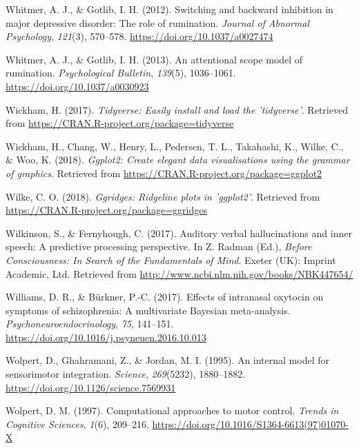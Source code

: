 \documentclass[a4paper,12pt,twoside,onecolumn,openright,final,oldfontcommands]{memoir}
\begin{document}
\leavevmode\hypertarget{ref-whitmer_switching_2012}{}%
Whitmer, A. J., \& Gotlib, I. H. (2012). Switching and backward inhibition in major depressive disorder: The role of rumination. \emph{Journal of Abnormal Psychology}, \emph{121}(3), 570--578. \url{https://doi.org/10.1037/a0027474}

\leavevmode\hypertarget{ref-Whitmer2013}{}%
Whitmer, A. J., \& Gotlib, I. H. (2013). An attentional scope model of rumination. \emph{Psychological Bulletin}, \emph{139}(5), 1036--1061. \url{https://doi.org/10.1037/a0030923}

\leavevmode\hypertarget{ref-R-tidyverse}{}%
Wickham, H. (2017). \emph{Tidyverse: Easily install and load the 'tidyverse'}. Retrieved from \url{https://CRAN.R-project.org/package=tidyverse}

\leavevmode\hypertarget{ref-R-ggplot2}{}%
Wickham, H., Chang, W., Henry, L., Pedersen, T. L., Takahashi, K., Wilke, C., \& Woo, K. (2018). \emph{Ggplot2: Create elegant data visualisations using the grammar of graphics}. Retrieved from \url{https://CRAN.R-project.org/package=ggplot2}

\leavevmode\hypertarget{ref-R-ggridges}{}%
Wilke, C. O. (2018). \emph{Ggridges: Ridgeline plots in 'ggplot2'}. Retrieved from \url{https://CRAN.R-project.org/package=ggridges}

\leavevmode\hypertarget{ref-wilkinson_auditory_2017}{}%
Wilkinson, S., \& Fernyhough, C. (2017). Auditory verbal hallucinations and inner speech: A predictive processing perspective. In Z. Radman (Ed.), \emph{Before Consciousness: In Search of the Fundamentals of Mind}. Exeter (UK): Imprint Academic, Ltd. Retrieved from \url{http://www.ncbi.nlm.nih.gov/books/NBK447654/}

\leavevmode\hypertarget{ref-williams_effects_2017}{}%
Williams, D. R., \& Bürkner, P.-C. (2017). Effects of intranasal oxytocin on symptoms of schizophrenia: A multivariate Bayesian meta-analysis. \emph{Psychoneuroendocrinology}, \emph{75}, 141--151. \url{https://doi.org/10.1016/j.psyneuen.2016.10.013}

\leavevmode\hypertarget{ref-wolpert_internal_1995}{}%
Wolpert, D., Ghahramani, Z., \& Jordan, M. I. (1995). An internal model for sensorimotor integration. \emph{Science}, \emph{269}(5232), 1880--1882. \url{https://doi.org/10.1126/science.7569931}

\leavevmode\hypertarget{ref-wolpert_computational_1997}{}%
Wolpert, D. M. (1997). Computational approaches to motor control. \emph{Trends in Cognitive Sciences}, \emph{1}(6), 209--216. \url{https://doi.org/10.1016/S1364-6613(97)01070-X}
\end{document}
